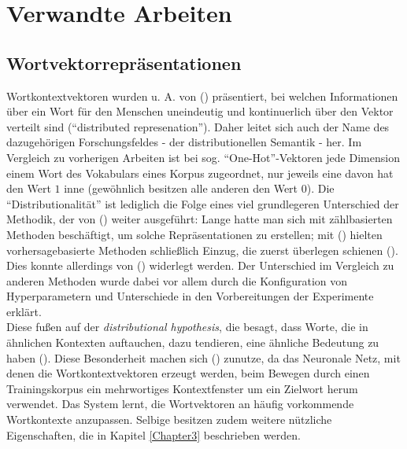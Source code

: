 
\chapter{Verwandte Arbeiten} %

\label{Chapter2} %


\section{Wortvektorrepräsentationen}\label{sec:represent}

Wortkontextvektoren wurden u. A. von (\cite{bengio2006neural}) präsentiert, bei welchen Informationen über ein Wort
 für den Menschen uneindeutig und kontinuerlich über den Vektor verteilt sind (``distributed represenation'').
Daher leitet sich auch der Name des dazugehörigen Forschungsfeldes - der distributionellen Semantik - her.
Im Vergleich zu vorherigen Arbeiten ist bei sog. ``One-Hot''-Vektoren jede Dimension einem Wort des Vokabulars eines Korpus zugeordnet,
nur jeweils eine davon hat den Wert $1$ inne (gewöhnlich besitzen alle anderen den Wert $0$).
Die ``Distributionalität'' ist lediglich die Folge eines viel grundlegeren Unterschied der Methodik, der von
(\cite{baroni2014don}) weiter ausgeführt: Lange hatte man sich mit zählbasierten Methoden beschäftigt, um solche Repräsentationen zu erstellen; mit (\cite{bengio2006neural}) hielten
vorhersagebasierte Methoden schließlich Einzug, die zuerst überlegen schienen (\cite{baroni2014don}). Dies konnte
allerdings von (\cite{levy2015improving}) widerlegt werden. Der Unterschied im Vergleich zu anderen Methoden
wurde dabei vor allem durch die Konfiguration von Hyperparametern und Unterschiede in den Vorbereitungen der Experimente
erklärt. \\

Diese fußen auf der \emph{distributional hypothesis}, die besagt, dass Worte, die in ähnlichen Kontexten auftauchen, dazu
 tendieren, eine ähnliche Bedeutung zu haben (\cite{harris1954distributional}).
Diese Besonderheit machen sich (\cite{bengio2006neural}) zunutze, da das Neuronale Netz, mit denen die Wortkontextvektoren
erzeugt werden, beim Bewegen durch einen Trainingskorpus ein mehrwortiges Kontextfenster um ein Zielwort herum
verwendet. Das System lernt, die Wortvektoren an häufig vorkommende Wortkontexte anzupassen. Selbige besitzen zudem
weitere nützliche Eigenschaften, die in Kapitel \ref{Chapter3} beschrieben werden.\\

